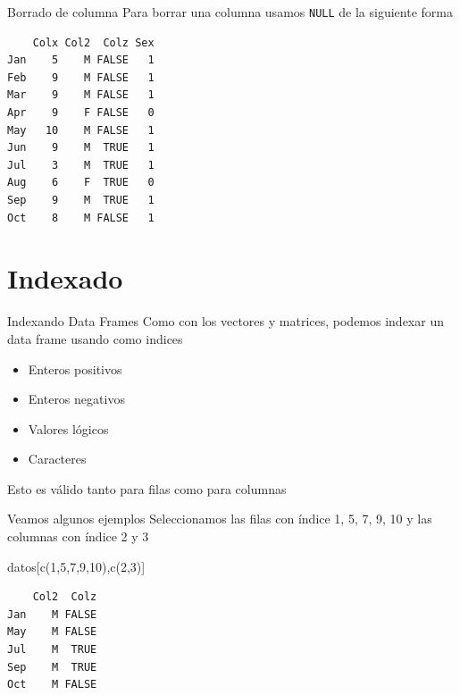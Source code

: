 \documentclass[
  ignorenonframetext,
  aspectratio=169,
  spanish,
]{beamer}
\newenvironment{Shaded}{\begin{snugshade}}{\end{snugshade}}
\newcommand{\ConstantTok}[1]{\textcolor[rgb]{0.56,0.35,0.01}{#1}}
\newcommand{\DecValTok}[1]{\textcolor[rgb]{0.68,0.00,0.00}{#1}}
\newcommand{\FunctionTok}[1]{\textcolor[rgb]{0.28,0.35,0.67}{#1}}
\newcommand{\NormalTok}[1]{\textcolor[rgb]{0.00,0.23,0.31}{#1}}
\newcommand{\OtherTok}[1]{\textcolor[rgb]{0.00,0.23,0.31}{#1}}
\newcommand{\SpecialCharTok}[1]{\textcolor[rgb]{0.37,0.37,0.37}{#1}}
\providecommand{\tightlist}{%
  \setlength{\itemsep}{0pt}\setlength{\parskip}{0pt}}
\begin{document}
\begin{frame}[fragile]{Borrado de columna}
\label{borrado-de-columna}
Para borrar una columna usamos \texttt{NULL} de la siguiente forma

\begin{Shaded}
\end{Shaded}

\begin{verbatim}
    Colx Col2  Colz Sex
Jan    5    M FALSE   1
Feb    9    M FALSE   1
Mar    9    M FALSE   1
Apr    9    F FALSE   0
May   10    M FALSE   1
Jun    9    M  TRUE   1
Jul    3    M  TRUE   1
Aug    6    F  TRUE   0
Sep    9    M  TRUE   1
Oct    8    M FALSE   1
\end{verbatim}
\end{frame}

\section{Indexado}\label{indexado}

\begin{frame}{Indexando Data Frames}
\label{indexando-data-frames}
Como con los vectores y matrices, podemos indexar un data frame usando
como indices

\begin{itemize}
\tightlist
\item
  Enteros positivos
\item
  Enteros negativos
\item
  Valores lógicos
\item
  Caracteres
\end{itemize}

Esto es válido tanto para filas como para columnas
\end{frame}

\begin{frame}[fragile]{Veamos algunos ejemplos}
\label{veamos-algunos-ejemplos}
Seleccionamos las filas con índice 1, 5, 7, 9, 10 y las columnas con
índice 2 y 3

\begin{Shaded}
\begin{Highlighting}[]
\NormalTok{datos[}\FunctionTok{c}\NormalTok{(}\DecValTok{1}\NormalTok{,}\DecValTok{5}\NormalTok{,}\DecValTok{7}\NormalTok{,}\DecValTok{9}\NormalTok{,}\DecValTok{10}\NormalTok{),}\FunctionTok{c}\NormalTok{(}\DecValTok{2}\NormalTok{,}\DecValTok{3}\NormalTok{)] }
\end{Highlighting}
\end{Shaded}

\begin{verbatim}
    Col2  Colz
Jan    M FALSE
May    M FALSE
Jul    M  TRUE
Sep    M  TRUE
Oct    M FALSE
\end{verbatim}
\end{frame}
\end{document}
